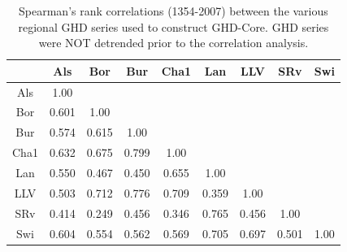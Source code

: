 \documentclass[12pt]{article}
\begin{document}
\begin{table}
\small
\caption{\small Spearman's rank correlations (1354-2007) between the various regional GHD series used to construct GHD-Core. GHD series were NOT detrended prior to the correlation analysis.}
\centering
\begin{tabular}{c c c c c c c c c}
\hline
& Als & Bor & Bur & Cha1 & Lan & LLV & SRv & Swi \\
\hline
Als &1.00 &  &  &  &  &  &  & \\
Bor & 0.601 & 1.00 &  &  &  &  &  & \\
Bur & 0.574 & 0.615 & 1.00 &  &  &  &  & \\
Cha1 & 0.632 & 0.675 & 0.799 & 1.00 &  &  &  & \\
Lan & 0.550 & 0.467 & 0.450 & 0.655 & 1.00 &  &  & \\
LLV & 0.503 & 0.712 & 0.776 & 0.709 & 0.359 & 1.00 &  & \\
SRv & 0.414 & 0.249 & 0.456 & 0.346 & 0.765 & 0.456 & 1.00 & \\
Swi & 0.604 & 0.554 & 0.562 & 0.569 & 0.705 & 0.697 & 0.501 & 1.00\\
\hline
\end{tabular}
\end{table}
\end{document}
